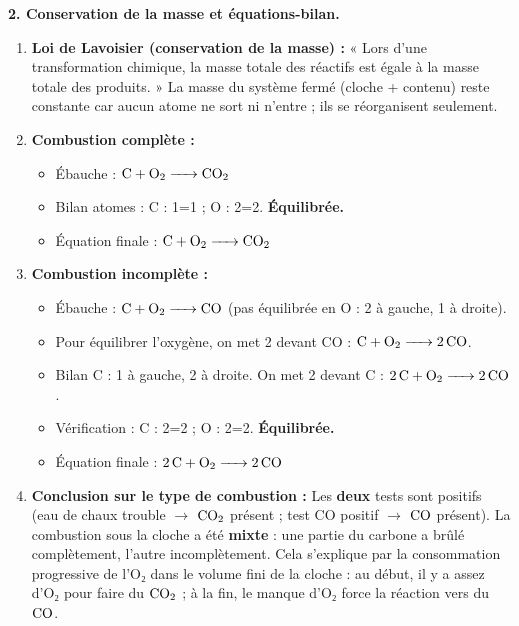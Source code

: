 \documentclass[11pt]{article}
\newcommand{\cle}[1]{{\popxbold\color{popdark}#1}}
\begin{document}
\begin{exoresolu}
\textbf{2. Conservation de la masse et équations-bilan.}
\begin{enumerate}
    \item[a)] \textbf{Loi de Lavoisier (conservation de la masse) :} « Lors d'une transformation chimique, la masse totale des réactifs est égale à la masse totale des produits. » La masse du système fermé (cloche + contenu) reste constante car aucun atome ne sort ni n'entre ; ils se réorganisent seulement.
    \item[b)] \textbf{Combustion complète :}
    \begin{itemize}
        \item Ébauche : $\ce{C + O2 -> CO2}$
        \item Bilan atomes : C : 1=1 ; O : 2=2. \textbf{Équilibrée.}
        \item \cle{Équation finale :} $\ce{C + O2 -> CO2}$
    \end{itemize}
    \item[c)] \textbf{Combustion incomplète :}
    \begin{itemize}
        \item Ébauche : $\ce{C + O2 -> CO}$ (pas équilibrée en O : 2 à gauche, 1 à droite).
        \item Pour équilibrer l'oxygène, on met 2 devant CO : $\ce{C + O2 -> 2CO}$.
        \item Bilan C : 1 à gauche, 2 à droite. On met 2 devant C : $\ce{2C + O2 -> 2CO}$.
        \item Vérification : C : 2=2 ; O : 2=2. \textbf{Équilibrée.}
        \item \cle{Équation finale :} $\ce{2C + O2 -> 2CO}$
    \end{itemize}
    \item[d)] \textbf{Conclusion sur le type de combustion :} Les \textbf{deux} tests sont positifs (eau de chaux trouble $\rightarrow$ $\ce{CO2}$ présent ; test CO positif $\rightarrow$ $\ce{CO}$ présent). La combustion sous la cloche a été \textbf{mixte} : une partie du carbone a brûlé complètement, l'autre incomplètement. Cela s'explique par la consommation progressive de l'O₂ dans le volume fini de la cloche : au début, il y a assez d'O₂ pour faire du $\ce{CO2}$ ; à la fin, le manque d'O₂ force la réaction vers du $\ce{CO}$.
\end{enumerate}


\end{exoresolu}
\end{document}
